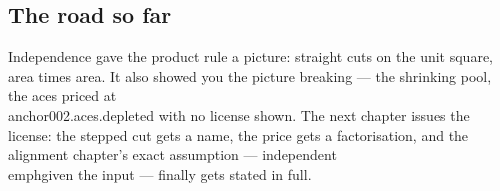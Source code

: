 \cleardoublepage
\begin{narrative}
\section*{The road so far}


\noindent Independence gave the product rule a picture: straight cuts on the unit square, area times area. It also showed you the picture breaking — the shrinking pool, the aces priced at \\anchor{002.aces.depleted} with no license shown. The next chapter issues the license: the stepped cut gets a name, the price gets a factorisation, and the alignment chapter's exact assumption — independent \\emph{given the input} — finally gets stated in full.
\end{narrative}
